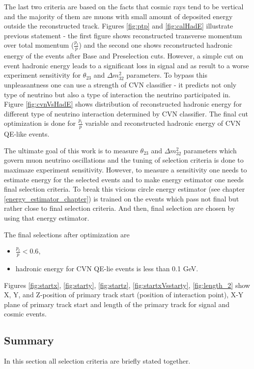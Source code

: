 The last two criteria are based on the facts that cosmic rays tend to be vertical and the majority of them are 
muons with small amount of deposited energy outside the reconstructed track. Figures \ref{fig:ptp} and \ref{fig:calHadE}
illustrate previous statement - the first figure shows reconstructed transverse momentum over total momentum 
($\frac{p_t}{p}$) and the second one shows reconstructed hadronic energy of the events after Base and Preselection 
cuts. However, a simple cut on event hadronic energy leads to a significant loss in signal and as result to a 
worse experiment sensitivity for $\theta_{23}$ and $\Delta m^2_{32}$ parameters. To bypass this unpleasantness one 
can use a strength of CVN classifier - it predicts not only type of neutrino but also a type of interaction the 
neutrino participated in. Figure \ref{fig:cvnVsHadE} shows distribution of reconstructed hadronic energy for 
different type of neutrino interaction determined by CVN classifier. The final cut optimization is done for 
$\frac{p_t}{p}$ variable and reconstructed hadronic energy of CVN QE-like events.

The ultimate goal of this work is to measure $\theta_{23}$ and $\Delta m^2_{32}$ parameters which govern muon
neutrino oscillations and the tuning of selection criteria is done to maximaze experiment sensitivity. However,
to measure a sensitivity one needs to estimate energy for the selected events and to make energy estimator one 
needs final selection criteria. To break this vicious circle energy estimator (see chapter \ref{energy_estimator_chapter})
is trained on the events which pass not final but rather close to final selection criteria. And then, final 
selection are chosen by using that energy estimator.

The final selections after optimization are
\begin{itemize}
\item $\frac{p_t}{p} < 0.6$,
\item hadronic energy for CVN QE-lie events is less than 0.1 GeV.
\end{itemize}
Figures \ref{fig:startx}, \ref{fig:starty}, \ref{fig:startz}, \ref{fig:startxVsstarty}, \ref{fig:length_2} show
X, Y, and Z-position of primary track start (position of interaction point), X-Y plane of primary track start and
length of the primary track for signal and cosmic events. 

\subsection{Summary}
In this section all selection criteria are briefly stated together. 

